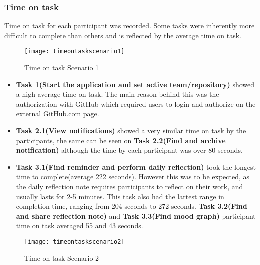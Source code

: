 \subsubsection{Time on task}
Time on task for each participant was recorded. Some tasks were inherently more difficult to complete than others and is reflected by the average time on task.
\begin{figure}[h!]
    \centering
        \texttt{[image: timeontaskscenario1]}
    \caption{Time on task Scenario 1}
    \label{timeontaskscenario1}
\end{figure}
\begin{itemize}
	\item \textbf{Task 1(Start the application and set active team/repository)} showed a high average time on task. The main reason behind this was the authorization with GitHub which required users to login and authorize on the external GitHub.com page.
	\item \textbf{Task 2.1(View notifications)} showed a very similar time on task by the participants, the same can be seen on \textbf{Task 2.2(Find and archive notification)} although the time by each participant was over 80 seconds.
	\item \textbf{Task 3.1(Find reminder and perform daily reflection)} took the longest time to complete(average 222 seconds). However this was to be expected, as the daily reflection note requires participants to reflect on their work, and usually lasts for 2-5 minutes. This task also had the lartest range in completion time, ranging from 204 seconds to 272 seconds. \textbf{Task 3.2(Find and share reflection note)} and \textbf{Task 3.3(Find mood graph)} participant time on task averaged 55 and 43 seconds. 
\end{itemize}
\begin{figure}[h!]
    \centering
        \texttt{[image: timeontaskscenario2]}
    \caption{Time on task Scenario 2}
    \label{timeontaskscenario2}
\end{figure}
